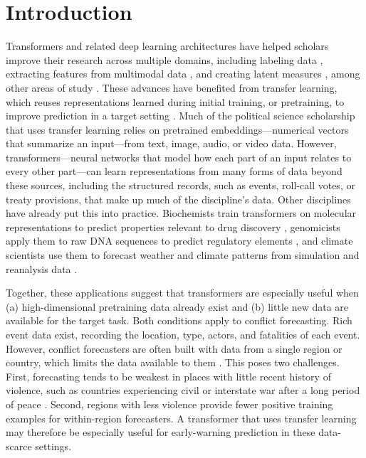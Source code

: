 \documentclass[11pt, letterpaper]{article}
\begin{document}
\section{Introduction}
\label{sec:intro}
Transformers and related deep learning architectures have helped scholars improve their research across multiple domains, including labeling data \citep{burnham2026debate, timoneda2025bert}, extracting features from multimodal data \citep{tarr2023automated, wu2022marmot, zhang2019casm}, and creating latent measures \citep{lemens2024positioning, rodriguez2023embedding}, among other areas of study \citep{halterman2025synthetic, wankmuller2024neural}. These advances have benefited from transfer learning, which reuses representations learned during initial training, or pretraining, to improve prediction in a target setting \citep{burnham2026debate, choi2026finetuned, laurer2024less, sui2026high}. Much of the political science scholarship that uses transfer learning relies on pretrained embeddings---numerical vectors that summarize an input---from text, image, audio, or video data.  However, transformers---neural networks that model how each part of an input relates to every other part---can learn representations from many forms of data beyond these sources, including the structured records, such as events, roll-call votes, or treaty provisions, that make up much of the discipline's data. Other disciplines have already put this into practice. Biochemists train transformers on molecular representations to predict properties relevant to drug discovery \citep{chithrananda2020chemberta}, genomicists apply them to raw DNA sequences to predict regulatory elements \citep{ji2021dnabert}, and climate scientists use them to forecast weather and climate patterns from simulation and reanalysis data \citep{nguyen2023climax}.

Together, these applications suggest that transformers are especially useful when (a) high-dimensional pretraining data already exist and (b) little new data are available for the target task. Both conditions apply to conflict forecasting. Rich event data exist, recording the location, type, actors, and fatalities of each event. However, conflict forecasters are often built with data from a single region or country, which limits the data available to them \citep{dorff2020networks, hegre2019views, radford2022highres}. This poses two challenges. First, forecasting tends to be weakest in places with little recent history of violence, such as countries experiencing civil or interstate war after a long period of peace \citep{hegre2019views, mueller2018reading}. Second, regions with less violence provide fewer positive training examples for within-region forecasters. A transformer that uses transfer learning may therefore be especially useful for early-warning prediction in these data-scarce settings.
\end{document}
